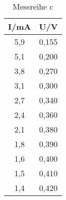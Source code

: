 

\begin{table}[h!]
  \centering
  \caption{Messreihe c}
  \label{tab:Recht}
  \begin{tabular}{c c }
    \toprule
     I/mA &	 U/V	   \\
    \midrule
   5,9  & 0,155	\\
   5,1  & 0,200	\\
   3,8  & 0,270	\\
   3,1  & 0,300 \\
   2,7  & 0,340 \\
   2,4  & 0,360	\\
   2,1  & 0,380	\\
   1,8  & 0,390	\\
   1,6  & 0,400 \\
   1,5  & 0,410	\\
   1,4  & 0,420	\\


    \bottomrule
  \end{tabular}
\end{table}
